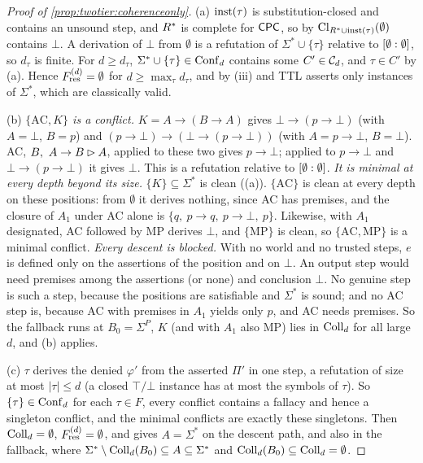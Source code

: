 \begin{proof}[Proof of \cref{prop:twotier:coherenceonly}]
(a) $\mathrm{inst}(\tau)$ is substitution-closed and contains an unsound step, and $R^{*}$ is complete for $\mathsf{CPC}$, so by  $\mathrm{Cl}_{R^{*}\cup\mathrm{inst}(\tau)}(\emptyset)$ contains $\bot$. A derivation of $\bot$ from $\emptyset$ is a refutation of $\Sigma^*\cup\{\tau\}$ relative to $[\emptyset : \emptyset]$, so $d_\tau$ is finite. For $d\ge d_\tau$, $\Sigma^*\cup\{\tau\}\in\mathrm{Conf}_d$ contains some $C'\in\mathcal{C}_d$, and $\tau\in C'$ by (a). Hence $F^{(d)}_{\mathrm{res}}=\emptyset$ for $d\ge\max_\tau d_\tau$, and by (iii) and  TTL asserts only instances of $\Sigma^*$, which are classically valid.

(b) \emph{$\{\mathrm{AC},K\}$ is a conflict.} $K=A\to(B\to A)$ gives $\bot\to(p\to\bot)$ (with $A=\bot$, $B=p$) and $(p\to\bot)\to(\bot\to(p\to\bot))$ (with $A=p\to\bot$, $B=\bot$). AC, $B,\ A\to B\rhd A$, applied to these two gives $p\to\bot$; applied to $p\to\bot$ and $\bot\to(p\to\bot)$ it gives $\bot$. This is a refutation relative to $[\emptyset : \emptyset]$. \emph{It is minimal at every depth beyond its size.} $\{K\}\subseteq\Sigma^*$ is clean ((a)). $\{\mathrm{AC}\}$ is clean at every depth on these positions: from $\emptyset$ it derives nothing, since AC has premises, and the closure of $A_1$ under AC alone is $\{q,\ p\to q,\ p\to\bot,\ p\}$. Likewise, with $A_1$ designated, AC followed by MP derives $\bot$, and $\{\mathrm{MP}\}$ is clean, so $\{\mathrm{AC},\mathrm{MP}\}$ is a minimal conflict. \emph{Every descent is blocked.} With no world and no trusted steps, $e$ is defined only on the assertions of the position and on $\bot$. An output step would need premises among the assertions (or none) and conclusion $\bot$. No genuine step is such a step, because the positions are satisfiable and $\Sigma^*$ is sound; and no AC step is, because AC with premises in $A_1$ yields only $p$, and AC needs premises. So the fallback runs at $B_0=\Sigma^P$, $K$ (and with $A_1$ also MP) lies in $\mathrm{Coll}_d$ for all large $d$, and (b) applies.

(c) $\tau$ derives the denied $\varphi'$ from the asserted $\Pi'$ in one step, a refutation of size at most $|\tau|\le d$ (a closed $\top/\bot$ instance has at most the symbols of $\tau$). So $\{\tau\}\in\mathrm{Conf}_d$ for each $\tau\in F$, every conflict contains a fallacy and hence a singleton conflict, and the minimal conflicts are exactly these singletons. Then $\mathrm{Coll}_d=\emptyset$, $F^{(d)}_{\mathrm{res}}=\emptyset$, and  gives $A=\Sigma^*$ on the descent path, and also in the fallback, where $\Sigma^*\setminus\mathrm{Coll}_d(B_0)\subseteq A\subseteq\Sigma^*$ and $\mathrm{Coll}_d(B_0)\subseteq\mathrm{Coll}_d=\emptyset$.
\end{proof}

